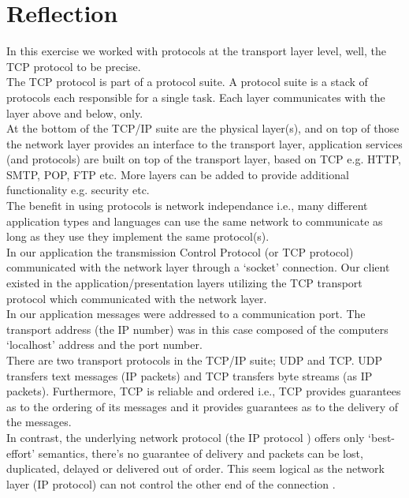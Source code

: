 \section{Reflection}
\label{tcp_reflection}

In this exercise we worked with protocols at the transport layer level, well, the TCP protocol to be precise. \\

The TCP protocol is part of a protocol suite. A protocol suite is a stack of protocols each responsible for a single task. 
Each layer communicates with the layer above and below, only. \\

At the bottom of the TCP/IP suite are the physical layer(s), and on top of those the network layer provides an interface to the transport layer, application services (and protocols) are built on top of the transport layer, based on TCP e.g. HTTP, SMTP, POP, FTP etc. 
More layers can be added to provide additional functionality e.g. security etc.\\

The benefit in using protocols is network independance i.e., many different application types and languages can use the same network to communicate as long as they use they implement the same protocol(s). \\

In our application the transmission Control Protocol (or TCP protocol) communicated with the network layer through a ‘socket’ connection. Our client existed in the application/presentation layers utilizing the TCP transport protocol which communicated with the network layer. \\

In our application messages were addressed to a communication port. The transport address (the IP number) was in this case composed of the computers  ‘localhost’ address and the port number. \\

There are two transport protocols in the TCP/IP suite; UDP and TCP. UDP transfers text messages (IP packets) and TCP transfers byte streams (as IP packets). Furthermore, TCP is reliable and ordered i.e., TCP provides guarantees as to the ordering of its messages and it provides guarantees as to the delivery of the messages. \\

In contrast, the underlying network protocol (the IP protocol ) offers only ‘best-effort’ semantics, there’s no guarantee of delivery and packets can be lost, duplicated, delayed or delivered out of order. This seem logical as the network layer (IP protocol) can not control the other end of the connection . 

